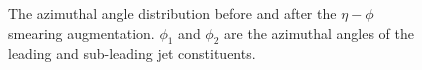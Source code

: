 \documentclass[12pt]{article}
\begin{document}
        \begin{figure}[htpb]
            \centering
            \caption{The azimuthal angle distribution before and after the $\eta-\phi$ smearing augmentation. $\phi_1$ and $\phi_2$ are the azimuthal angles of the leading and sub-leading jet constituents.}
            \label{fig:jet_constituent_phi_distribution}
        \end{figure}
\end{document}

